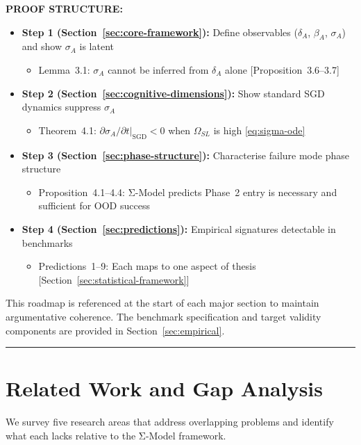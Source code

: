\documentclass[11pt,a4paper]{article}
\begin{document}
\textbf{PROOF STRUCTURE:}
\begin{itemize}[nosep]
\item \textbf{Step 1 (Section~\ref{sec:core-framework}):} Define observables ($\delta_A$, $\beta_A$, $\sigma_A$) and show $\sigma_A$ is latent
  \begin{itemize}[nosep]
  \item Lemma~3.1: $\sigma_A$ cannot be inferred from $\delta_A$ alone [Proposition~3.6--3.7]
  \end{itemize}
\item \textbf{Step 2 (Section~\ref{sec:cognitive-dimensions}):} Show standard SGD dynamics suppress $\sigma_A$
  \begin{itemize}[nosep]
  \item Theorem~4.1: $\partial\sigma_A/\partial t|_{\text{SGD}} < 0$ when $\Omega_{SL}$ is high \eqref{eq:sigma-ode}
  \end{itemize}
\item \textbf{Step 3 (Section~\ref{sec:phase-structure}):} Characterise failure mode phase structure
  \begin{itemize}[nosep]
  \item Proposition~4.1--4.4: Σ-Model predicts Phase~2 entry is necessary and sufficient for OOD success
  \end{itemize}
\item \textbf{Step 4 (Section~\ref{sec:predictions}):} Empirical signatures detectable in benchmarks
  \begin{itemize}[nosep]
  \item Predictions~1--9: Each maps to one aspect of thesis [Section~\ref{sec:statistical-framework}]
  \end{itemize}
\end{itemize}

This roadmap is referenced at the start of each major section to maintain
argumentative coherence. The benchmark specification and target validity
components are provided in Section~\ref{sec:empirical}.

\noindent\rule{\linewidth}{0.4pt}

\section{Related Work and Gap Analysis}\label{sec:related-work}

We survey five research areas that address overlapping problems and identify what each lacks relative to the Σ-Model framework.
\end{document}
